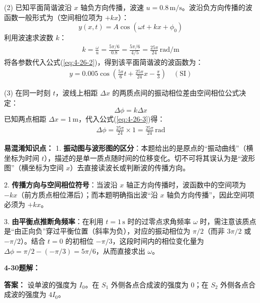 (2) 已知平面简谐波沿 $x$ 轴负方向传播，波速 $u = 0.8\,\text{m/s}$。波沿负方向传播的波函数一般形式为（空间相位项为 $+kx$）：
\begin{equation}\label{eq:4-26-2}
	y(x,t) = A \cos(\omega t + kx + \phi_0)
\end{equation}
利用波速求波数 $k$：
\begin{align*}
	k = \frac{\omega}{u} = \frac{5\pi/6}{0.8} = \frac{5\pi/6}{4/5} = \frac{25\pi}{24}\,\text{rad/m}
\end{align*}
将各参数代入公式(\ref{eq:4-26-2})，得到该平面简谐波的波函数为：
\begin{align*}
	y = 0.005 \cos(\frac{5\pi}{6}t + \frac{25\pi}{24}x - \frac{\pi}{3}) \quad (\text{SI})
\end{align*}

(3) 在同一时刻 $t$，波线上相距 $\Delta x$ 的两质点间的振动相位差由空间相位公式决定：
\begin{equation}\label{eq:4-26-3}
	\Delta \phi = k \Delta x
\end{equation}
已知两点相距 $\Delta x = 1\,\text{m}$，代入公式(\ref{eq:4-26-3})得：
\begin{align*}
	\Delta \phi = \frac{25\pi}{24} \times 1 = \frac{25\pi}{24}\,\text{rad}
\end{align*}

\textbf{易混淆知识点： }
1. \textbf{振动图与波形图的区分}：本题给出的是原点的“振动曲线”（横坐标为时间 $t$），描述的是单一质点随时间的位移变化。切不可将其误认为是“波形图”（横坐标为空间 $x$）去直接读波长或判断波的传播方向。

2. \textbf{传播方向与空间相位符号}：当波沿 $x$ 轴正方向传播时，波函数中的空间项为 $-kx$（前方质点相位滞后）；而本题明确指出波“沿 $x$ 轴负方向传播”，因此空间项必须为 $+kx$。

3. \textbf{由平衡点推断角频率}：在利用 $t=1\,\text{s}$ 时的过零点求角频率 $\omega$ 时，需注意该质点是“由正向负”穿过平衡位置（斜率为负），对应的振动相位为 $\pi/2$（而非 $3\pi/2$ 或 $-\pi/2$）。结合 $t=0$ 的初相位 $-\pi/3$，这段时间内的相位变化量为 $\Delta\phi = \pi/2 - (-\pi/3) = 5\pi/6$，从而直接求出 $\omega$。

\vspace{2em}

\textbf{4-30题解： }
\setcounter{equation}{0}
\renewcommand{\theHequation}{4-30.\arabic{equation}}

\textbf{答案： }
设单波的强度为 $I_0$。在 $S_1$ 外侧各点合成波的强度为 $0$；在 $S_2$ 外侧各点合成波的强度为 $4I_0$。

